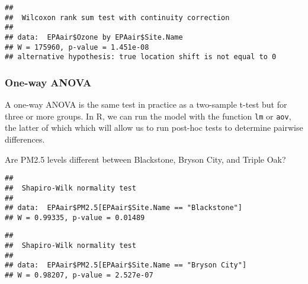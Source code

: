 \documentclass[]{article}
\newenvironment{Shaded}{\begin{snugshade}}{\end{snugshade}}
\newcommand{\KeywordTok}[1]{\textcolor[rgb]{0.13,0.29,0.53}{\textbf{#1}}}
\newcommand{\DecValTok}[1]{\textcolor[rgb]{0.00,0.00,0.81}{#1}}
\newcommand{\StringTok}[1]{\textcolor[rgb]{0.31,0.60,0.02}{#1}}
\newcommand{\OperatorTok}[1]{\textcolor[rgb]{0.81,0.36,0.00}{\textbf{#1}}}
\newcommand{\NormalTok}[1]{#1}
\begin{document}
\begin{verbatim}
## 
##  Wilcoxon rank sum test with continuity correction
## 
## data:  EPAair$Ozone by EPAair$Site.Name
## W = 175960, p-value = 1.451e-08
## alternative hypothesis: true location shift is not equal to 0
\end{verbatim}

\subsubsection{One-way ANOVA}\label{one-way-anova}

A one-way ANOVA is the same test in practice as a two-sample t-test but
for three or more groups. In R, we can run the model with the function
\texttt{lm} or \texttt{aov}, the latter of which which will allow us to
run post-hoc tests to determine pairwise differences.

Are PM2.5 levels different between Blackstone, Bryson City, and Triple
Oak?

\begin{Shaded}
\end{Shaded}

\begin{verbatim}
## 
##  Shapiro-Wilk normality test
## 
## data:  EPAair$PM2.5[EPAair$Site.Name == "Blackstone"]
## W = 0.99335, p-value = 0.01489
\end{verbatim}

\begin{Shaded}
\end{Shaded}

\begin{verbatim}
## 
##  Shapiro-Wilk normality test
## 
## data:  EPAair$PM2.5[EPAair$Site.Name == "Bryson City"]
## W = 0.98207, p-value = 2.527e-07
\end{verbatim}

\begin{Shaded}
\end{Shaded}
\end{document}
